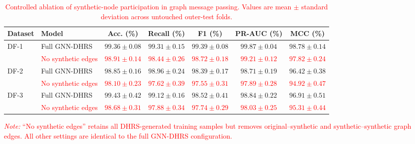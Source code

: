 \documentclass[pdflatex,sn-mathphys-num]{sn-jnl}%
\theoremstyle{thmstyleone}%
\theoremstyle{thmstyletwo}%
\theoremstyle{thmstylethree}%
\begin{document}
\begin{table}[!ht]
\centering
\caption{\textcolor{red}{
Controlled ablation of synthetic-node participation in graph message passing.
Values are mean \(\pm\) standard deviation across untouched outer-test folds.
}}
\label{tab:synthetic_edge_ablation}

\scriptsize
\setlength{\tabcolsep}{3.2pt}
\renewcommand{\arraystretch}{1.05}

\begin{tabular}{@{}llccccc@{}}
\toprule
\textbf{Dataset} &
\textbf{Model} &
\textbf{Acc. (\%)} &
\textbf{Recall (\%)} &
\textbf{F1 (\%)} &
\textbf{PR-AUC (\%)} &
\textbf{MCC (\%)} \\
\midrule

\multirow{2}{*}{DF-1}
& Full GNN-DHRS
& \textbf{$99.36\pm0.08$}
& \textbf{$99.31\pm0.15$}
& \textbf{$99.39\pm0.08$}
& \textbf{$99.87\pm0.04$}
& \textbf{$98.78\pm0.14$} \\

& \textcolor{red}{No synthetic edges}
& \textcolor{red}{$98.91\pm0.14$}
& \textcolor{red}{$98.44\pm0.26$}
& \textcolor{red}{$98.72\pm0.18$}
& \textcolor{red}{$99.21\pm0.12$}
& \textcolor{red}{$97.82\pm0.24$} \\

\midrule

\multirow{2}{*}{DF-2}
& Full GNN-DHRS
& \textbf{$98.85\pm0.16$}
& \textbf{$98.96\pm0.24$}
& \textbf{$98.39\pm0.17$}
& \textbf{$98.71\pm0.19$}
& \textbf{$96.42\pm0.38$} \\

& \textcolor{red}{No synthetic edges}
& \textcolor{red}{$98.10\pm0.23$}
& \textcolor{red}{$97.62\pm0.39$}
& \textcolor{red}{$97.55\pm0.31$}
& \textcolor{red}{$97.89\pm0.28$}
& \textcolor{red}{$94.92\pm0.47$} \\

\midrule

\multirow{2}{*}{DF-3}
& Full GNN-DHRS
& \textbf{$99.43\pm0.42$}
& \textbf{$99.12\pm0.16$}
& \textbf{$98.52\pm0.41$}
& \textbf{$98.84\pm0.22$}
& \textbf{$96.91\pm0.51$} \\

& \textcolor{red}{No synthetic edges}
& \textcolor{red}{$98.68\pm0.31$}
& \textcolor{red}{$97.88\pm0.34$}
& \textcolor{red}{$97.74\pm0.29$}
& \textcolor{red}{$98.03\pm0.25$}
& \textcolor{red}{$95.31\pm0.44$} \\

\bottomrule
\end{tabular}

\vspace{2pt}
\begin{minipage}{0.98\textwidth}
\scriptsize
\textcolor{red}{
\textit{Note:} ``No synthetic edges'' retains all DHRS-generated training
samples but removes original--synthetic and synthetic--synthetic graph edges.
All other settings are identical to the full GNN-DHRS configuration.
}
\end{minipage}

\end{table}
\end{document}
